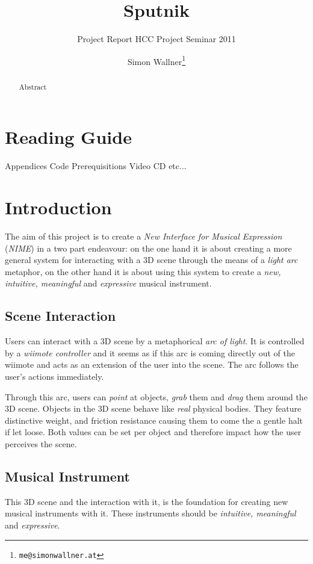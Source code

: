 \documentclass[10pt,a4paper]{scrartcl}
\title{Sputnik}
\subtitle{Project Report HCC Project Seminar 2011}
\author{Simon Wallner\footnote{\texttt{me@simonwallner.at}}}
\begin{document}
\maketitle

\begin{abstract}
Abstract
\end{abstract}

\section{Reading Guide}
Appendices
Code
Prerequisitions
Video
CD
etc...



\section{Introduction}
The aim of this project is to create a \emph{New Interface for Musical Expression} (\emph{NIME}) in a two part endeavour: on the one hand it is about creating a more general system for interacting with a 3D scene through the means of a \emph{light arc} metaphor, on the other hand it is about using this system to create a \emph{new, intuitive, meaningful} and \emph{expressive} musical instrument.

\subsection{Scene Interaction}
Users can interact with a 3D scene by a metaphorical \emph{arc of light}. It is controlled by a \emph{wiimote controller} and it seems as if this arc is coming directly out of the wiimote and acts as an extension of the user into the scene. The arc follows the user's actions immediately. 

Through this arc, users can \emph{point} at objects, \emph{grab} them and \emph{drag} them around the 3D scene. Objects in the 3D scene behave like \emph{real} physical bodies. They feature distinctive weight, and friction resistance causing them to come the a gentle halt if let loose. Both values can be set per object and therefore impact how the user perceives the scene.


\subsection{Musical Instrument}
This 3D scene and the interaction with it, is the foundation for creating new musical instruments with it. These instruments should be \emph{intuitive, meaningful} and \emph{ expressive}.
\end{document}
